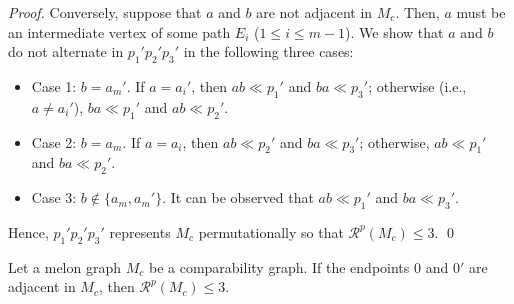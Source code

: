 \documentclass{llncs}
\begin{document}
\begin{proof}
	Conversely, suppose that $a$ and $b$ are not adjacent in $M_c$. Then, $a$ must be an intermediate vertex of some path $E_i$ ($1 \le i \le m-1$). We show that  $a$ and $b$ do not alternate in $p_1'p_2'p_3'$ in the following three cases:
	\begin{itemize}
		\item Case 1: $b = a_{m}'$. If $a =  a_{i}'$, then $ab \ll p_1'$ and $ba \ll p_3'$; otherwise (i.e., $a \ne a_{i}'$), $ba \ll p_1'$ and $ab \ll p_2'$. 
		\item Case 2: $b = a_{m} $. If $a =  a_{i}$, then $ab \ll p_2'$ and $ba \ll p_3'$; otherwise, $ab \ll p_1'$ and $ba \ll p_2'$. 
		\item Case 3: $ b \not \in \{a_{m}, a_{m}'\}$. It can be observed that $ab \ll p_1'$ and $ba \ll p_3'$. 
	\end{itemize}
	Hence, $p_1'p_2'p_3'$ represents $M_c$ permutationally so that $\mathcal{R}^p(M_c) \le 3$.	\qed
\end{proof}


\begin{theorem}\label{00'adj_fc}
	Let a melon graph $M_c$ be a comparability graph. If the endpoints $0$ and $0'$ are adjacent in $M_c$, then $\mathcal{R}^p(M_c) \le 3$.
\end{theorem}
\end{document}
